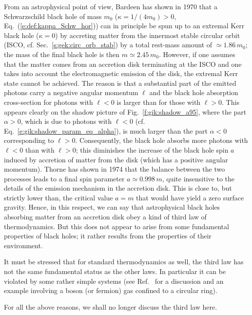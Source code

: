 From an astrophysical point of view, Bardeen has shown in 1970 \cite{Barde70a}
that a Schwarzschild black hole
of mass $m_0$ ($\kappa = 1/(4m_0) > 0$, Eq.~(\ref{e:def:kappa_Schw_hor}))
can in principle be spun up to an extremal Kerr black hole
($\kappa = 0$)
by accreting matter from the
innermost stable circular orbit
(ISCO, cf. Sec.~\ref{s:gek:circ_orb_stab}) by a total rest-mass amount of
$\simeq 1.86\, m_0$; the mass of the final black hole is then $m \simeq 2.45\, m_0$.
However, if one assumes that the matter comes from an accretion disk
terminating at the ISCO and
one takes into account the electromagnetic emission of the disk, the extremal Kerr state
cannot be achieved. The reason is that a substantial part of the emitted photons carry a negative angular momentum $\ell$ and
the black hole absorption cross-section for photons with $\ell<0$ is larger than for those with
$\ell>0$. This appears clearly on the shadow picture of Fig.~\ref{f:gik:shadow_a95},
where the part $\alpha>0$, which is due to photons
with $\ell < 0$ (cf. Eq.~\ref{e:gik:shadow_param_eq_alpha}), is much larger than the part $\alpha<0$
corresponding to $\ell > 0$. Consequently, the black hole absorbs more photons with $\ell < 0$
than with $\ell>0$; this diminishes the increase of the black hole spin $a$ induced by accretion of  matter from the disk (which has a positive angular momentum). Thorne has shown in 1974 \cite{Thorn74} that the balance between the two processes leads to a final spin parameter $a \simeq 0.998 \, m$, quite insensitive to the details
of the emission mechanism in the accretion disk. This is close to, but strictly lower than, the critical
value $a = m$ that would have yield a zero surface gravity. Hence, in this respect, we can say that
astrophysical black holes absorbing matter from an accretion disk obey a kind of third law of thermodynamics.
But this does not appear to arise from some fundamental properties of black holes; it rather results from the properties of their environment.

It must be stressed that for standard thermodynamics as well, the third law has not the same fundamental status as the other laws.
In particular it can be violated by some rather simple systems (see Ref.~\cite{Wald97} for a discussion and an example involving a boson (or fermion) gas confined to a circular ring).

For all the above reasons, we shall no longer discuss the third law here.

